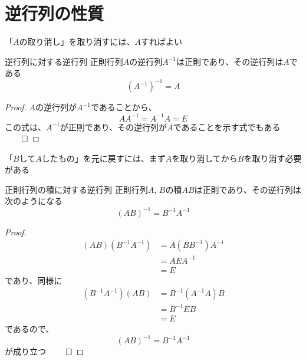 \documentclass[../../../topic_linear-algebra]{subfiles}
\begin{document}
\sectionline
\section{逆行列の性質}

「$A$の取り消し」を取り消すには、$A$すればよい

\begin{theorem}{逆行列に対する逆行列}\label{thm:inverse-of-inverse}
  正則行列$A$の逆行列$A^{-1}$は正則であり、その逆行列は$A$である
  \begin{equation*}
    (A^{-1})^{-1} = A
  \end{equation*}
\end{theorem}

\begin{proof}
  $A$の逆行列が$A^{-1}$であることから、
  \begin{equation*}
    AA^{-1} = A^{-1}A = E
  \end{equation*}
  この式は、$A^{-1}$が正則であり、その逆行列が$A$であることを示す式でもある $\qed$
\end{proof}

\sectionline

「$B$して$A$したもの」を元に戻すには、まず$A$を取り消してから$B$を取り消す必要がある

\begin{theorem}{正則行列の積に対する逆行列}\label{thm:inverse-of-product}
  正則行列$A,\,B$の積$AB$は正則であり、その逆行列は次のようになる
  \begin{equation*}
    (AB)^{-1} = B^{-1} A^{-1}
  \end{equation*}
\end{theorem}

\begin{proof}
  \begin{align*}
    (AB)(B^{-1} A^{-1}) & = A(B B^{-1}) A^{-1} \\
                        & = A E A^{-1}         \\
                        & = E
  \end{align*}
  であり、同様に
  \begin{align*}
    (B^{-1} A^{-1})(AB) & = B^{-1} (A^{-1} A) B \\
                        & = B^{-1} E B          \\
                        & = E
  \end{align*}
  であるので、
  \begin{equation*}
    (AB)^{-1} = B^{-1} A^{-1}
  \end{equation*}
  が成り立つ $\qed$
\end{proof}
\end{document}

